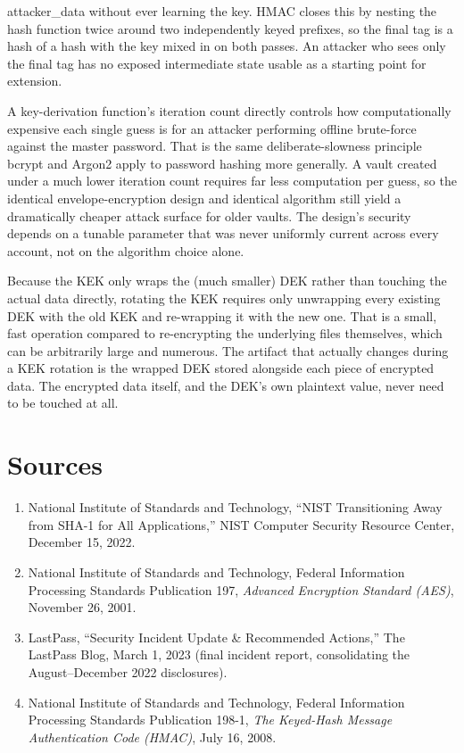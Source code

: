 \begin{answerkey}
{attacker\_data} without ever learning the key. HMAC closes this by nesting the hash function twice
around two independently keyed prefixes, so the final tag is a hash of a hash with the key mixed in
on both passes. An attacker who sees only the final tag has no exposed intermediate state usable
as a starting point for extension.
\item A key-derivation function's iteration count directly controls how computationally expensive
each single guess is for an attacker performing offline brute-force against the master password.
That is the same deliberate-slowness principle bcrypt and Argon2 apply to password hashing more
generally. A vault created under a much lower iteration count requires far less computation per
guess, so the identical envelope-encryption design and identical algorithm still yield a
dramatically cheaper attack surface for older vaults. The design's security depends on a tunable
parameter that was never uniformly current across every account, not on the algorithm choice alone.
\item Because the KEK only wraps the (much smaller) DEK rather than touching the actual data
directly, rotating the KEK requires only unwrapping every existing DEK with the old KEK and
re-wrapping it with the new one. That is a small, fast operation compared to re-encrypting the
underlying files themselves, which can be arbitrarily large and numerous. The artifact that
actually changes during a KEK rotation is the wrapped DEK stored alongside each piece of encrypted
data. The encrypted data itself, and the DEK's own plaintext value, never need to be touched at
all.
\end{answerkey}

\section*{Sources}
\begin{enumerate}[label=\lbrack\arabic*\rbrack, leftmargin=2.2em]
\item {}National Institute of Standards and Technology, ``NIST Transitioning Away
from SHA-1 for All Applications,'' NIST Computer Security Resource Center, December 15, 2022.
\item {}National Institute of Standards and Technology, Federal Information Processing
Standards Publication 197, \emph{Advanced Encryption Standard (AES)}, November 26, 2001.
\item {}LastPass, ``Security Incident Update \& Recommended Actions,'' The LastPass
Blog, March 1, 2023 (final incident report, consolidating the August--December 2022 disclosures).
\item {}National Institute of Standards and Technology, Federal Information Processing
Standards Publication 198-1, \emph{The Keyed-Hash Message Authentication Code (HMAC)}, July 16,
2008.
\end{enumerate}
